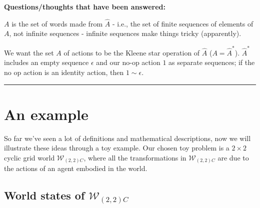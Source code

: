 {    \textbf{Questions/thoughts that have been answered:}
    \begin{compactitem}
        \item $A$ is the set of words made from $\hat{A}$ - i.e., the set of finite sequences of elements of $A$, not infinite sequences - infinite sequences make things tricky (apparently).

        \item We want the set $A$ of actions to be the Kleene star operation of $\hat{A}$ ($A = \hat{A}^{\ast}$). $\hat{A}^{\ast}$ includes an empty sequence $\epsilon$ and our no-op action $1$ as separate sequences; if the no op action is an identity action, then $1 \sim \epsilon$.
    \end{compactitem}
    \noindent\rule{\textwidth}{1mm}
}

\section{An example}

So far we've seen a lot of definitions and mathematical descriptions, now we will illustrate these ideas through a toy example.
Our chosen toy problem is a $2\times 2$ cyclic grid world $\mathscr{W}_{(2,2)C}$, where all the transformations in $\mathscr{W}_{(2,2)C}$ are due to the actions of an agent embodied in the world.

\subsection{World states of $\mathscr{W}_{(2,2)C}$}\label{sec:World states of example}

